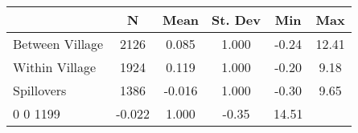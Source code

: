 \begin{tabular}{l*{5}{c}}\hline&\multicolumn{1}{c}{N}&\multicolumn{1}{c}{Mean}&\multicolumn{1}{c}{St. Dev}&\multicolumn{1}{c}{Min}&\multicolumn{1}{c}{Max}\\ \hline 
Between Village & 2126 & 0.085 & 1.000 & -0.24 & 12.41 \\
Within Village & 1924 & 0.119 & 1.000 & -0.20 & 9.18 \\
Spillovers & 1386 & -0.016 & 1.000 & -0.30 & 9.65 \\
0 0 1199 & -0.022 & 1.000 & -0.35 & 14.51 \\
\hline \end{tabular}
